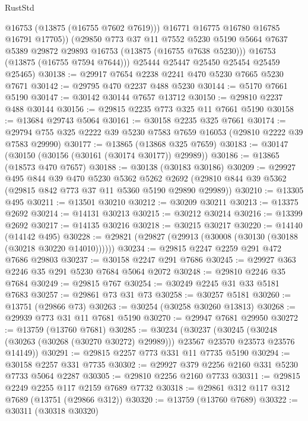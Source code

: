\begin{lexlean}{RustStd}
\begin{coremodule}
              @16753
              (@13875 (@16755 @7602 @7619)))
            @16771
            @16775
            @16780
            @16785
            @16791
            @17705))
        (@29850
          @773
          @37
          @11
          @7552
          @5230
          @5190
          @5664
          @7637
          @5389
          @29872
          @29893
          @16753
          (@13875 (@16755 @7638 @5230)))
        @16753
        (@13875 (@16755 @7594 @7644)))
      @25444
      @25447
      @25450
      @25454
      @25459
      @25465)
@30138 := @29917 @7654 @2238 @2241 @470 @5230 @7665 @5230 @7671
@30142 := @29795 @470 @2237 @488 @5230
@30144 := @5170 @7661 @5190
@30147 := @30142 @30144 @7657 @13712
@30150 := @29810 @2237 @488 @30144
@30156 := @29815 @2235 @773 @325 @11 @7661 @5190
@30158 := @13684 @29743 @5064
@30161 := @30158 @2235 @325 @7661
@30174 := @29794 @755 @325 @2222 @39 @5230 @7583 @7659 @16053 (@29810 @2222 @39 @7583 @29990)
@30177 := @13865 (@13868 @325 @7659)
@30183 := @30147 (@30150 (@30156 (@30161 (@30174 @30177)) @29989))
@30186 := @13865 (@18573 @470 @7657)
@30188 := @30138 (@30183 @30186)
@30209 := @29927
    @495
    @844
    @39
    @470
    @5230
    @5362
    @5262
    @2692
    (@29810 @844 @39 @5362 (@29815 @842 @773 @37 @11 @5360 @5190 @29890 @29989))
@30210 := @13305 @495
@30211 := @13501 @30210
@30212 := @30209 @30211
@30213 := @13375 @2692
@30214 := @14131 @30213
@30215 := @30212 @30214
@30216 := @13399 @2692
@30217 := @14135 @30216
@30218 := @30215 @30217
@30220 := @14140 (@14142 @495)
@30228 := @29821 (@29827 (@29913 (@30008 (@30130 (@30188 (@30218 @30220 @14010))))))
@30234 := @29815 @2247 @2259 @291 @472 @7686 @29803
@30237 := @30158 @2247 @291 @7686
@30245 := @29927 @363 @2246 @35 @291 @5230 @7684 @5064 @2072
@30248 := @29810 @2246 @35 @7684
@30249 := @29815 @767
@30254 := @30249 @2245 @31 @33 @5181 @7683
@30257 := @29861 @73 @31 @73
@30258 := @30257 @5181
@30260 := @13751 (@29866 @73)
@30263 := @30254 (@30258 @30260 @13813)
@30268 := @29939 @773 @31 @11 @7681 @5190
@30270 := @29947 @7681 @29950
@30272 := @13759 (@13760 @7681)
@30285 := @30234
    (@30237
      (@30245 (@30248 (@30263 (@30268 (@30270 @30272) @29989))) @23567 @23570 @23573 @23576 @14149))
@30291 := @29815 @2257 @773 @331 @11 @7735 @5190
@30294 := @30158 @2257 @331 @7735
@30302 := @29927 @379 @2256 @2160 @331 @5230 @7733 @5064 @2287
@30305 := @29810 @2256 @2160 @7733
@30311 := @29815 @2249 @2255 @117 @2159 @7689 @7732
@30318 := @29861 @312 @117 @312 @7689 (@13751 (@29866 @312))
@30320 := @13759 (@13760 @7689)
@30322 := @30311 (@30318 @30320)

\end{coremodule}
\end{lexlean}
